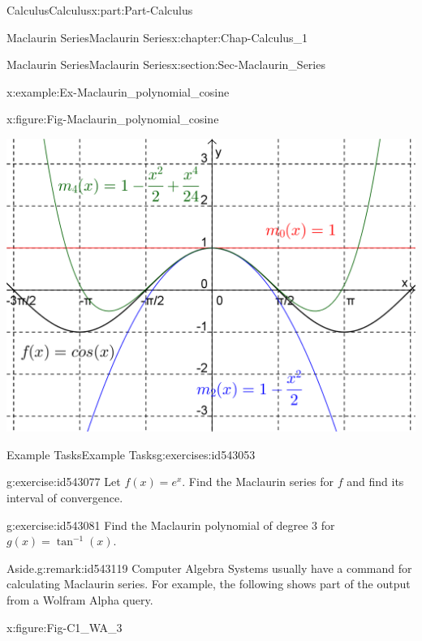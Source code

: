 \documentclass[oneside,10pt,]{book}
\numberwithin{equation}{section}
\begin{document}
\begin{partptx}{Calculus}{}{Calculus}{}{}{x:part:Part-Calculus}
\begin{chapterptx}{Maclaurin Series}{}{Maclaurin Series}{}{}{x:chapter:Chap-Calculus_1}
\begin{sectionptx}{Maclaurin Series}{}{Maclaurin Series}{}{}{x:section:Sec-Maclaurin_Series}
\begin{example}{}{x:example:Ex-Maclaurin_polynomial_cosine}
\begin{figureptx}{}{x:figure:Fig-Maclaurin_polynomial_cosine}{}%
\begin{image}{0.05}{0.9}{0.05}%
\includegraphics[width=\linewidth]{./Calculus/Images/1/Fig-Maclaurin_polynomial_cosine.png}
\end{image}%
\tcblower
\end{figureptx}%
\end{example}
%
%
\typeout{************************************************}
\typeout{************************************************}
%
\begin{exercises-subsection-numberless}{Example Tasks}{}{Example Tasks}{}{}{g:exercises:id543053}
\begin{divisionexercise}{1}{}{}{g:exercise:id543077}%
Let \(f(x)=e^x\). Find the Maclaurin series for \(f\) and find its interval of convergence.\end{divisionexercise}%
\begin{divisionexercise}{2}{}{}{g:exercise:id543081}%
Find the Maclaurin polynomial of degree \(3\) for \(g(x) = \tan^{-1}(x)\).\end{divisionexercise}%
\end{exercises-subsection-numberless}
\begin{remark}{Aside.}{g:remark:id543119}%
Computer Algebra Systems usually have a command for calculating Maclaurin series. For example, the following shows part of the output from a Wolfram Alpha query.%
\begin{figureptx}{}{x:figure:Fig-C1_WA_3}{}%
\begin{image}{0.05}{0.9}{0.05}%

\end{image}
\end{figureptx}
\end{remark}
\end{sectionptx}
\end{chapterptx}
\end{partptx}
\end{document}
